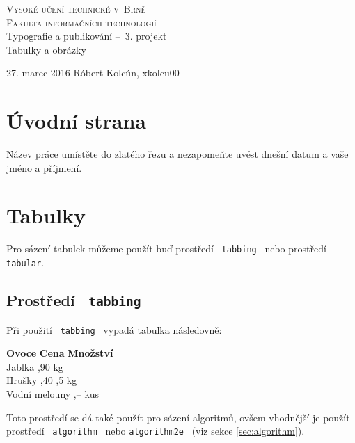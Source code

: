 \documentclass[11pt,a4paper]{article}
\begin{document}
	
	\begin{titlepage}
		\begin{center}
			\Huge
			\textsc{\Huge Vysoké učení technické v~Brně \\ {\huge Fakulta informačních technologií \\}}
			{\LARGE Typografie a publikování --\ 3. projekt} \\ {\Huge Tabulky a obrázky}
		\end{center}
		{\Large 27. marec 2016 \hfill
			Róbert Kolcún, xkolcu00}
	\end{titlepage}
	
	
	
	\section{Úvodní strana}
	Název práce umístěte do zlatého řezu a nezapomeňte uvést dnešní datum a vaše jméno a příjmení.
	
	\section{Tabulky}
	Pro sázení tabulek můžeme použít buď prostředí \, \texttt{tabbing} \, nebo prostředí \, \texttt{tabular}.
	
	\subsection{Prostředí \, \texttt{tabbing}}
	Při použití \, \texttt{tabbing} \, vypadá tabulka následovně:
	
	\begin{tabbing}
		
		\textbf{Ovoce} \qquad \qquad \= \textbf{Cena} \quad \= \textbf{Množství} \\
		Jablka ,90  kg \\
		Hrušky ,40 ,5 kg \\
		Vodní melouny ,--  kus
		
	\end{tabbing}
	
	\noindent
	Toto prostředí se dá také použít pro sázení algoritmů, ovšem vhodnější je použít
	prostředí \, \texttt{algorithm} \, nebo \texttt{algorithm2e} \, (viz sekce \ref{sec:algorithm}).
	
\end{document}
